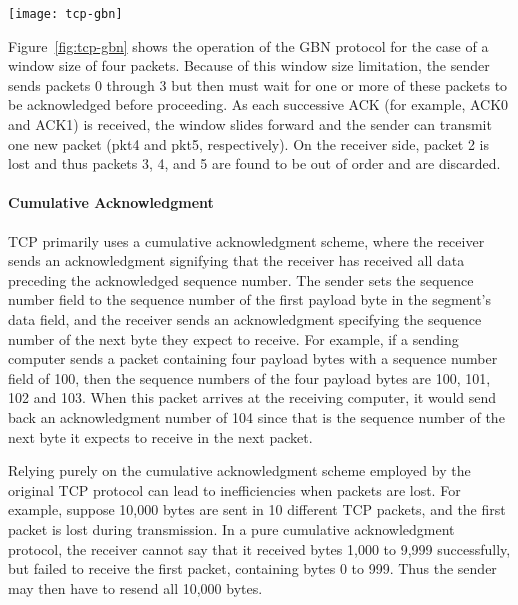 \begin{minipage}{.5\linewidth}
  \texttt{[image: tcp-gbn]}\label{fig:tcp-gbn}
\end{minipage}\quad
\begin{minipage}{.5\linewidth}
  Figure~\ref{fig:tcp-gbn} shows the operation of the GBN protocol for the case of a
  window size of four packets. Because of this window size limitation, the sender sends
  packets 0 through 3 but then must wait for one or more of these packets to be
  acknowledged before proceeding. As each successive ACK (for example, ACK0 and ACK1) is
  received, the window slides forward and the sender can transmit one new packet (pkt4 and
  pkt5, respectively). On the receiver side, packet 2 is lost and thus packets 3, 4, and 5
  are found to be out of order and are discarded. 
\end{minipage}

\paragraph{Cumulative Acknowledgment}

   TCP primarily uses a
  cumulative acknowledgment scheme, where the receiver sends an acknowledgment signifying
  that the receiver has received all data preceding the acknowledged sequence number. The
  sender sets the sequence number field to the sequence number of the first payload byte
  in the segment's data field, and the receiver sends an acknowledgment specifying the
  sequence number of the next byte they expect to receive. For example, if a sending
  computer sends a packet containing four payload bytes with a sequence number field of
  100, then the sequence numbers of the four payload bytes are 100, 101, 102 and 103. When
  this packet arrives at the receiving computer, it would send back an acknowledgment
  number of 104 since that is the sequence number of the next byte it expects to receive
  in the next packet.

  Relying purely on the cumulative acknowledgment scheme employed by the original TCP
  protocol can lead to inefficiencies when packets are lost. For example, suppose 10,000
  bytes are sent in 10 different TCP packets, and the first packet is lost during
  transmission. In a pure cumulative acknowledgment protocol, the receiver cannot say that
  it received bytes 1,000 to 9,999 successfully, but failed to receive the first packet,
  containing bytes 0 to 999. Thus the sender may then have to resend all 10,000
  bytes. 


